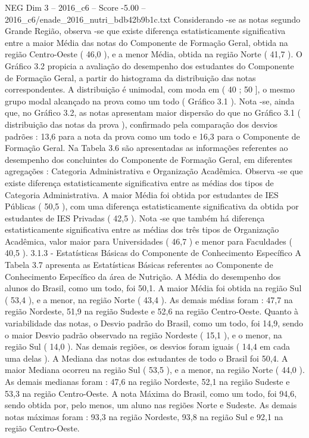 \begin{textsample}{NEG Dim 3 – 2016\_c6 – Score -5.00 – 2016\_c6/enade\_2016\_nutri\_bdb42b9b1c.txt}
Considerando -se as notas segundo Grande Região, observa -se que existe diferença estatisticamente significativa entre a maior Média das notas do Componente de Formação Geral, obtida na região Centro-Oeste ( 46,0 ), e a menor Média, obtida na região Norte ( 41,7 ).
O Gráfico 3.2 propicia a avaliação do desempenho dos estudantes do Componente de Formação Geral, a partir do histograma da distribuição das notas correspondentes.
A distribuição é unimodal, com moda em ( 40 ; 50 ], o mesmo grupo modal alcançado na prova como um todo ( Gráfico 3.1 ).
Nota -se, ainda que, no Gráfico 3.2, as notas apresentam maior dispersão do que no Gráfico 3.1 ( distribuição das notas da prova ), confirmado pela comparação dos desvios padrões : 13,6 para a nota da prova como um todo e 16,3 para o Componente de Formação Geral.
Na Tabela 3.6 são apresentadas as informações referentes ao desempenho dos concluintes do Componente de Formação Geral, em diferentes agregações : Categoria Administrativa e Organização Acadêmica.
Observa -se que existe diferença estatisticamente significativa entre as médias dos tipos de Categoria Administrativa.
A maior Média foi obtida por estudantes de IES Públicas ( 50,5 ), com uma diferença estatisticamente significativa da obtida por estudantes de IES Privadas ( 42,5 ).
Nota -se que também há diferença estatisticamente significativa entre as médias dos três tipos de Organização Acadêmica, valor maior para Universidades ( 46,7 ) e menor para Faculdades ( 40,5 ). 3.1.3 - Estatísticas Básicas do Componente de Conhecimento Específico A Tabela 3.7 apresenta as Estatísticas Básicas referentes ao Componente de Conhecimento Específico da área de Nutrição.
A Média do desempenho dos alunos do Brasil, como um todo, foi 50,1.
A maior Média foi obtida na região Sul ( 53,4 ), e a menor, na região Norte ( 43,4 ).
As demais médias foram : 47,7 na região Nordeste, 51,9 na região Sudeste e 52,6 na região Centro-Oeste.
Quanto à variabilidade das notas, o Desvio padrão do Brasil, como um todo, foi 14,9, sendo o maior Desvio padrão observado na região Nordeste ( 15,1 ), e o menor, na região Sul ( 14,0 ).
Nas demais regiões, os desvios foram iguais ( 14,4 em cada uma delas ).
A Mediana das notas dos estudantes de todo o Brasil foi 50,4.
A maior Mediana ocorreu na região Sul ( 53,5 ), e a menor, na região Norte ( 44,0 ).
As demais medianas foram : 47,6 na região Nordeste, 52,1 na região Sudeste e 53,3 na região Centro-Oeste.
A nota Máxima do Brasil, como um todo, foi 94,6, sendo obtida por, pelo menos, um aluno nas regiões Norte e Sudeste.
As demais notas máximas foram : 93,3 na região Nordeste, 93,8 na região Sul e 92,1 na região Centro-Oeste.

\end{textsample}

